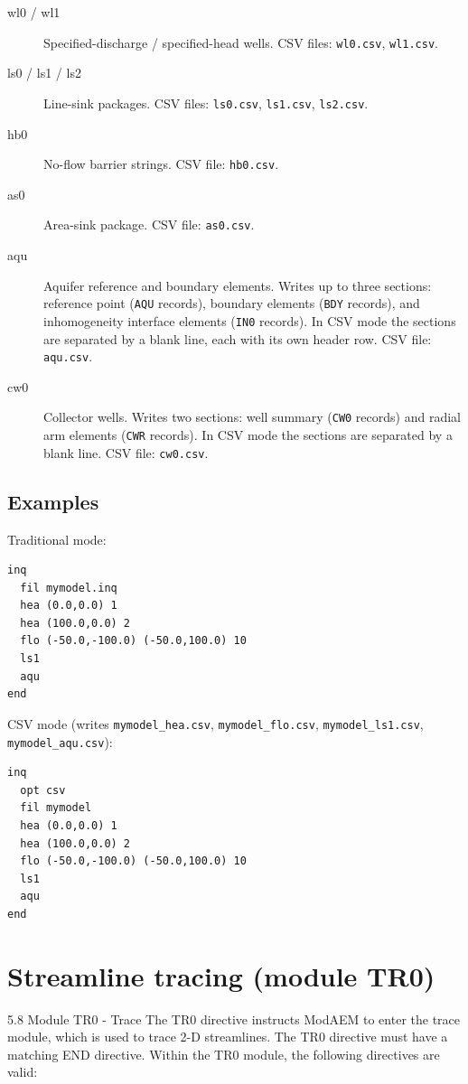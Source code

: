 \begin{description}
\item[\textsf{wl0} / \textsf{wl1}] Specified-discharge / specified-head wells.
  CSV files: \texttt{wl0.csv}, \texttt{wl1.csv}.
\item[\textsf{ls0} / \textsf{ls1} / \textsf{ls2}] Line-sink packages.
  CSV files: \texttt{ls0.csv}, \texttt{ls1.csv}, \texttt{ls2.csv}.
\item[\textsf{hb0}] No-flow barrier strings. CSV file: \texttt{hb0.csv}.
\item[\textsf{as0}] Area-sink package. CSV file: \texttt{as0.csv}.
\item[\textsf{aqu}] Aquifer reference and boundary elements. Writes up to three sections:
  reference point (\texttt{AQU} records), boundary elements (\texttt{BDY} records), and
  inhomogeneity interface elements (\texttt{IN0} records). In CSV mode the sections are
  separated by a blank line, each with its own header row. CSV file: \texttt{aqu.csv}.
\item[\textsf{cw0}] Collector wells. Writes two sections: well summary (\texttt{CW0} records)
  and radial arm elements (\texttt{CWR} records). In CSV mode the sections are separated by a
  blank line. CSV file: \texttt{cw0.csv}.
\end{description}

\subsection{Examples}

Traditional mode:
\begin{verbatim}
inq
  fil mymodel.inq
  hea (0.0,0.0) 1
  hea (100.0,0.0) 2
  flo (-50.0,-100.0) (-50.0,100.0) 10
  ls1
  aqu
end
\end{verbatim}

CSV mode (writes \texttt{mymodel\_hea.csv}, \texttt{mymodel\_flo.csv},
\texttt{mymodel\_ls1.csv}, \texttt{mymodel\_aqu.csv}):
\begin{verbatim}
inq
  opt csv
  fil mymodel
  hea (0.0,0.0) 1
  hea (100.0,0.0) 2
  flo (-50.0,-100.0) (-50.0,100.0) 10
  ls1
  aqu
end
\end{verbatim}

\section{Streamline tracing (module TR0)\label{sec:tr0-module}}

5.8 Module TR0 - Trace The TR0 directive instructs ModAEM to enter
the trace module, which is used to trace 2-D streamlines. The TR0
directive must have a matching END directive. Within the TR0 module,
the following directives are valid:

